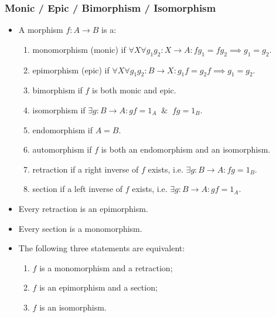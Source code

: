 \documentclass[UTF8,aspectratio=43,11pt,colorlinks,compress,openany]{beamer}%
\begin{document}
\begin{frame}\frametitle{Monic / Epic / Bimorphism / Isomorphism}
\begin{itemize}
	\item A morphism $f: A\to B$ is a:
\begin{enumerate}
	\item monomorphism (monic) if $\forall X\forall g_1g_2: X\to A: fg_1=fg_2\implies g_1=g_2$.
	\item epimorphism (epic) if $\forall X\forall g_1g_2: B\to X: g_1f=g_2f\implies g_1=g_2$.
	\item bimorphism if $f$ is both monic and epic.
	\item isomorphism if $\exists g: B\to A: gf=1_A\;\;\&\;\;fg=1_B$.
	\item endomorphism if $A=B$.
	\item automorphism if $f$ is both an endomorphism and an isomorphism.
	\item retraction if a right inverse of $f$ exists, i.e. $\exists g: B\to A: fg=1_B$.
	\item section if a left inverse of $f$ exists, i.e. $\exists g: B\to A: gf=1_A$.
\end{enumerate}
	\item Every retraction is an epimorphism.
	\item Every section is a monomorphism.
	\item The following three statements are equivalent:
\begin{enumerate}
	\item $f$ is a monomorphism and a retraction;
	\item $f$ is an epimorphism and a section;
	\item $f$ is an isomorphism.
\end{enumerate}
\end{itemize}
\end{frame}
\end{document}
